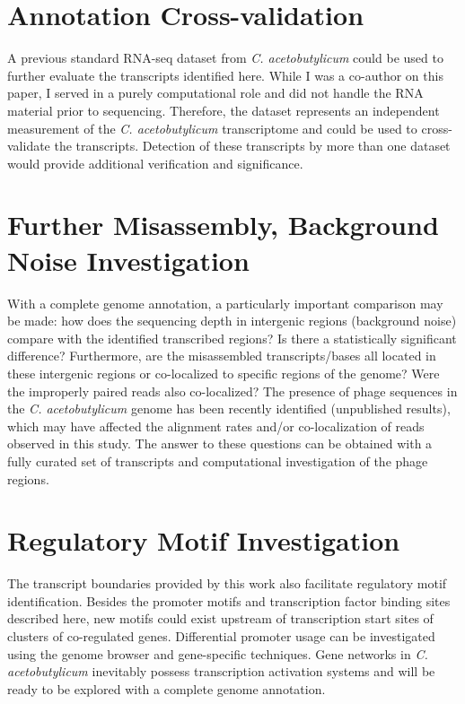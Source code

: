 \section{Annotation Cross-validation}
A previous standard RNA-seq dataset from \textit{C. acetobutylicum} could be used to further evaluate the transcripts identified here.\cite{39} While I was a co-author on this paper, I served in a purely computational role and did not handle the RNA material prior to sequencing. Therefore, the dataset represents an independent measurement of the \textit{C. acetobutylicum} transcriptome and could be used to cross-validate the transcripts. Detection of these transcripts by more than one dataset would provide additional verification and significance.

\section{Further Misassembly, Background Noise Investigation}
With a complete genome annotation, a particularly important comparison may be made: how does the sequencing depth in intergenic regions (background noise) compare with the identified transcribed regions? Is there a statistically significant difference? Furthermore, are the misassembled transcripts/bases all located in these intergenic regions or co-localized to specific regions of the genome? Were the improperly paired reads also co-localized? The presence of phage sequences in the \textit{C. acetobutylicum} genome has been recently identified (unpublished results), which may have affected the alignment rates and/or co-localization of reads observed in this study. The answer to these questions can be obtained with a fully curated set of transcripts and computational investigation of the phage regions.



\section{Regulatory Motif Investigation}
The transcript boundaries provided by this work also facilitate regulatory motif identification. Besides the promoter motifs and transcription factor binding sites described here, new motifs could exist upstream of transcription start sites of clusters of co-regulated genes. Differential promoter usage can be investigated using the genome browser and gene-specific techniques. Gene networks in \textit{C. acetobutylicum} inevitably possess transcription activation systems and will be ready to be explored with a complete genome annotation.

